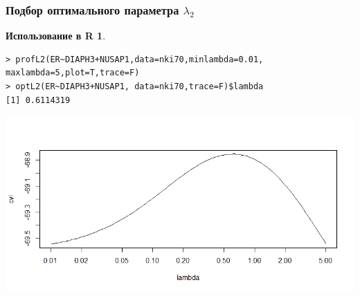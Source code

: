 \documentclass{beamer}
\newtheorem{exmpr}{Использование в R}
\begin{document}
\begin{frame}[containsverbatim]
\frametitle{Подбор оптимального параметра $\lambda_2$}
\begin{exmpr}
\begin{verbatim}
> profL2(ER~DIAPH3+NUSAP1,data=nki70,minlambda=0.01,
maxlambda=5,plot=T,trace=F)
> optL2(ER~DIAPH3+NUSAP1, data=nki70,trace=F)$lambda
[1] 0.6114319
\end{verbatim}
\end{exmpr}
\includegraphics[width=1\textwidth,height=0.6\textheight]{penalizedplot3.png}
\end{frame}
\end{document}
